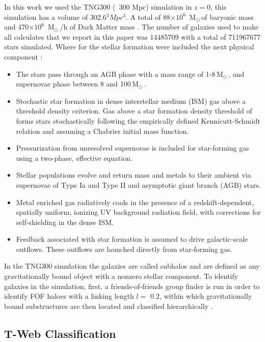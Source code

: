 \documentclass[usenatbib]{mnras}
\newcommand{\Msun}{\,{\rm M}$_{\odot}$\,}
\begin{document}
In this work we used the TNG300 (~300 Mpc) simulation in $z=0$, this simulation has a volume of 302.6$^3 Mpc^3$. 
A total of 88$\times 10^{6}$ \Msun of baryonic mass
and 470$\times 10^{6}$ \Msun/h of Dark Matter mass \cite{Nelson2015}. 
The number of galaxies used to make all calculates that we report in this paper
was 14485709 with a total of 711967677 stars simulated. Where for the stellar formation were included the next physical component \cite{Nelson2015,Pillepich2018a}:
\begin{itemize}
    \item The stars pass through an AGB phase with a mass range of 1-8\Msun, and supernovae phase between 8 and 100\Msun. 
    \item Stochastic star formation in dense interstellar medium (ISM) gas above a threshold density criterion. Gas above a star formation density threshold of forms stars stochastically following the empirically defined Kennicutt-Schmidt relation and assuming a Chabrier initial mass function.
    \item Pressurization from unresolved supernovae is included for star-forming gas using a two-phase, effective equation.
    \item Stellar populations evolve and return mass and metals to their ambient via supernovae of Type Ia and Type II and asymptotic giant branch (AGB) stars.
    \item Metal enriched gas radiatively cools in the presence of a redshift-dependent, spatially uniform, ionizing UV background radiation field, with corrections for self-shielding in the dense ISM.
    \item Feedback associated with star formation is assumed to drive galactic-scale outflows. These outflows are launched directly from star-forming gas.
\end{itemize}


In the TNG300 simulation the galaxies are called subhalos and
are defined as any gravitationally
bound object with a nonzero
stellar component.
To identify galaxies in the simulation,
first, a friends-of-friends group finder is run
in order to identify FOF haloes with
a linking length $l=$ 0.2,
within which gravitationally bound substructures
are then located and classified hierarchically \cite{Pillepich2018a}.
 

\subsection{T-Web Classification}
\end{document}
